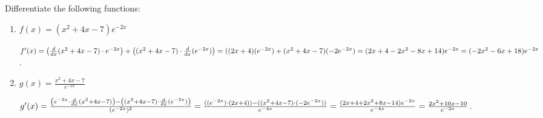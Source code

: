 \documentclass[nooutcomes]{ximera}
\begin{document}
\begin{problem}
Differentiate the following functions:

	\begin{enumerate}
	
	\item  $f(x) = (x^2 + 4x - 7) e^{-2x}$
			\begin{freeResponse}
			$f'(x) = \left( \frac{d}{dx}(x^2 + 4x - 7) \cdot e^{-2x} \right) + \left((x^2 + 4x - 7) \cdot \frac{d}{dx}(e^{-2x}) \right)
			= ((2x+4)(e^{-2x}) + (x^2 + 4x - 7)(-2e^{-2x})
			= (2x + 4 - 2x^2 - 8x + 14)e^{-2x}
			= (-2x^2 - 6x + 18)e^{-2x}$.
			\end{freeResponse}
			
			
			
	\item  $g(x) = \frac{x^2 + 4x - 7}{e^{-2x}}$
			\begin{freeResponse}
			$g'(x) = \frac{\left( e^{-2x} \cdot \frac{d}{dx}(x^2 + 4x - 7) \right) - \left( (x^2 + 4x - 7) \cdot \frac{d}{dx}(e^{-2x}) \right)}{(e^{-2x})^2}
			= \frac{((e^{-2x}) \cdot (2x+4)) - ((x^2 + 4x - 7) \cdot (-2e^{-2x}))}{e^{-4x}}
			= \frac{(2x + 4 + 2x^2 + 8x - 14)e^{-2x}}{e^{-4x}}
			= \frac{2x^2 + 10x - 10}{e^{-2x}}$.
			\end{freeResponse}
			
			
			
			
	\end{enumerate}		
\end{problem}
	
	
	
	
			
			
\end{document}

